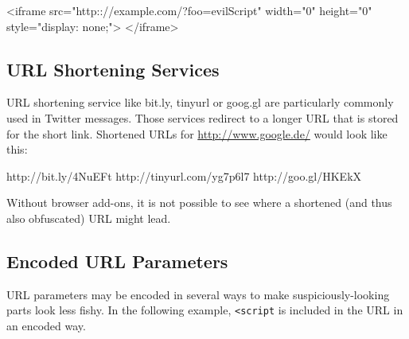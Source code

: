 \begin{htmlcode}
<iframe src="http:://example.com/?foo=evilScript"
  width="0" height="0" style="display: none;">
</iframe>
\end{htmlcode}

\subsection{URL Shortening Services}
URL shortening service like bit.ly, tinyurl or goog.gl are particularly commonly used in Twitter messages. Those services redirect to a longer URL that is stored for the short link. Shortened URLs for \url{http://www.google.de/} would look like this:

\begin{textcode}
 http://bit.ly/4NuEFt
 http://tinyurl.com/yg7p6l7
 http://goo.gl/HKEkX
\end{textcode}

Without browser add-ons, it is not possible to see where a shortened (and thus also obfuscated) URL might lead.

\subsection{Encoded URL Parameters}
URL parameters may be encoded in several ways to make suspiciously-looking parts look less fishy. In the following example, \texttt{<script} is included in the URL in an encoded way.

